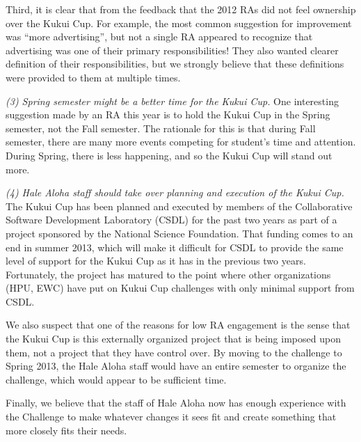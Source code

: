 \documentclass[]{IEEEconf}
\begin{document}
Third, it is clear that from the feedback that the 2012 RAs did not feel ownership
over the Kukui Cup.  For example, the most common suggestion for improvement was 
``more advertising'', but not a single RA appeared to recognize that advertising was one
of their primary responsibilities!  They also wanted clearer definition of their
responsibilities, but we strongly believe that these definitions were provided to them at
multiple times. 

{\em (3) Spring semester might be a better time for the Kukui Cup.}  One interesting
suggestion made by an RA this year is to hold the Kukui Cup in the Spring semester, not
the Fall semester.  The rationale for this is that during Fall semester, there are many
more events competing for student's time and attention.  During Spring, there is less
happening, and so the Kukui Cup will stand out more.  

{\em (4) Hale Aloha staff should take over planning and execution of the Kukui Cup.}  The
Kukui Cup has been planned and executed by members of the Collaborative Software
Development Laboratory (CSDL) for the past two years as part of a project sponsored by the
National Science Foundation.  That funding comes to an end in summer 2013, which will make
it difficult for CSDL to provide the same level of support for the Kukui Cup as it has in
the previous two years.  Fortunately, the project has matured to the point where other
organizations (HPU, EWC) have put on Kukui Cup challenges with only minimal support from
CSDL. 

We also suspect that one of the reasons for low RA engagement is the sense that the Kukui
Cup is this externally organized project that is being imposed upon them, not a project
that they have control over.  By moving to the challenge to Spring 2013, the Hale Aloha
staff would have an entire semester to organize the challenge, which would appear to be
sufficient time. 

Finally, we believe that the staff of Hale Aloha now has enough experience with the
Challenge to make whatever changes it sees fit and create something that more closely fits
their needs.  
\end{document}
